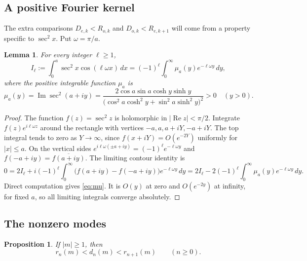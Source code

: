 \documentclass[11pt]{article}
\newtheorem{lemma}[theorem]{Lemma}
\newtheorem{proposition}[theorem]{Proposition}
\DeclareMathOperator{\Impart}{Im}
\DeclareMathOperator{\Repart}{Re}
\begin{document}
\subsection{A positive Fourier kernel}

The extra comparisons $D_{e,k}<R_{o,k}$ and $D_{o,k}<R_{e,k+1}$ will
come from a property specific to $\sec^2x$. Put $\omega=\pi/a$.

\begin{lemma}\label{lem:kernel}
For every integer $\ell\geq1$,
\begin{equation}\label{eq:kernel}
 I_\ell:=\int_0^a\sec^2x\cos(\ell\omega x)\,dx
 =(-1)^\ell\int_0^\infty\mu_a(y)e^{-\ell\omega y}\,dy,
\end{equation}
where the positive integrable function $\mu_a$ is
\begin{equation}\label{eq:mu}
 \mu_a(y)=\Impart\sec^2(a+iy)
 =\frac{2\cos a\sin a\cosh y\sinh y}
 {\bigl(\cos^2a\cosh^2y+\sin^2a\sinh^2y\bigr)^2}>0
 \quad(y>0).
\end{equation}
\end{lemma}

\begin{proof}
The function $f(z)=\sec^2z$ is holomorphic in $|\Repart z|<\pi/2$.
Integrate $f(z)e^{i\ell\omega z}$ around the rectangle with vertices
$-a,a,a+iY,-a+iY$. The top integral tends to zero as $Y\to\infty$,
since $f(x+iY)=O(e^{-2Y})$ uniformly for $|x|\leq a$.
On the vertical sides $e^{i\ell\omega(\pm a+iy)}=(-1)^\ell
e^{-\ell\omega y}$ and $f(-a+iy)=\overline{f(a+iy)}$.
The limiting contour identity is
\[
 0=2I_\ell+i(-1)^\ell\int_0^\infty
       \bigl(f(a+iy)-f(-a+iy)\bigr)e^{-\ell\omega y}\,dy
   =2I_\ell-2(-1)^\ell\int_0^\infty\mu_a(y)e^{-\ell\omega y}\,dy.
\]
Direct computation gives \eqref{eq:mu}. It is $O(y)$ at zero and
$O(e^{-2y})$ at infinity, for fixed $a$, so all limiting integrals
converge absolutely.
\end{proof}

\subsection{The nonzero modes}

\begin{proposition}\label{prop:positive-modes}
If $|m|\geq1$, then
\begin{equation}\label{eq:strong-interlace}
 r_n(m)<d_n(m)<r_{n+1}(m)\qquad(n\geq0).
\end{equation}
\end{proposition}
\end{document}
